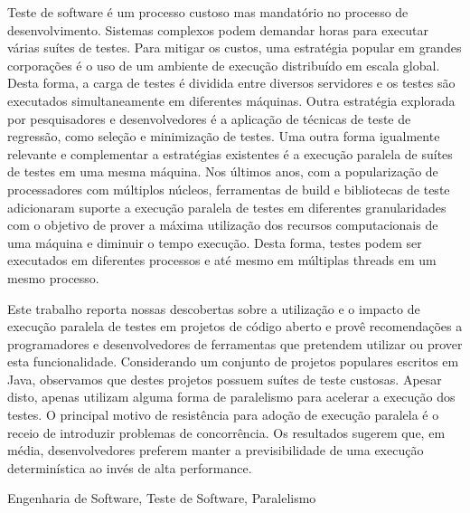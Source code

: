 Teste de software é um processo custoso mas mandatório no processo de
desenvolvimento. Sistemas complexos podem demandar horas para executar várias
suítes de testes. Para mitigar os custos, uma estratégia popular em grandes
corporações é o uso de um ambiente de execução distribuído em escala global.
Desta forma, a carga de testes é dividida entre diversos servidores e os testes
são executados simultaneamente em diferentes máquinas. Outra estratégia
explorada por pesquisadores e desenvolvedores é a aplicação de técnicas de teste
de regressão, como seleção e minimização de testes. Uma outra forma igualmente
relevante e complementar a estratégias existentes é a execução paralela de
suítes de testes em uma mesma máquina. Nos últimos anos, com a popularização de
processadores com múltiplos núcleos, ferramentas de build e bibliotecas de
teste adicionaram suporte a execução paralela de testes em diferentes
granularidades com o objetivo de prover a máxima utilização dos recursos
computacionais de uma máquina e diminuir o tempo execução. Desta forma, testes
podem ser executados em diferentes processos e até mesmo em múltiplas threads
em um mesmo processo.

Este trabalho reporta nossas descobertas sobre a utilização e o impacto de
execução paralela de testes em projetos de código aberto e provê recomendações
a programadores e desenvolvedores de ferramentas que pretendem utilizar ou
prover esta funcionalidade. Considerando um conjunto de \numSubjs{} projetos
populares escritos em Java, observamos que \percentMedLongRunning{} destes
projetos possuem suítes de teste custosas. Apesar disto, apenas
\percentParallelUpdated{} utilizam alguma forma de paralelismo para acelerar a
execução dos testes.
O principal motivo de resistência para adoção de execução paralela é o receio
de introduzir problemas de concorrência. Os resultados sugerem que, em média,
desenvolvedores preferem manter a previsibilidade de uma execução
determinística ao invés de alta performance. 

\begin{keywords}
Engenharia de Software, Teste de Software, Paralelismo
\end{keywords}
